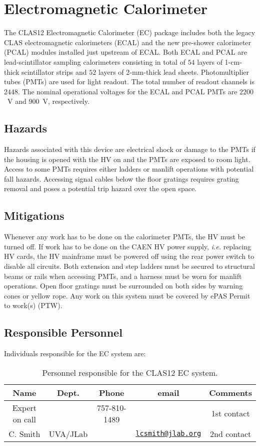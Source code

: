 \section{Electromagnetic Calorimeter}

The CLAS12 Electromagnetic Calorimeter (EC) package includes both the legacy CLAS 
electromagnetic calorimeters (ECAL) and the new pre-shower calorimeter (PCAL) modules 
installed just upstream of ECAL. Both ECAL and PCAL are lead-scintillator sampling 
calorimeters consisting in total of $54$ layers of 1-cm-thick scintillator strips and 
$52$ layers of 2-mm-thick lead sheets. Photomultiplier tubes (PMTs) are used for light 
readout. The total number of readout channels is $2448$. The nominal operational voltages 
for the ECAL and PCAL PMTs are $2200$~V and $900$~V, respectively. 

\subsection{Hazards} 

Hazards associated with this device are electrical shock or damage to the PMTs if the 
housing is opened with the HV on and the PMTs are exposed to room light.  Access to some 
PMTs requires either ladders or manlift operations with potential fall hazards. Accessing 
signal cables below the floor gratings requires grating removal and poses a potential trip 
hazard over the open space. 

\subsection{Mitigations}

Whenever any work has to be done on the calorimeter PMTs, the HV must be turned off. If work 
has to be done on the CAEN HV power supply, {\it i.e.} replacing HV cards, the HV mainframe must 
be powered off using the rear power switch to disable all circuits. Both extension and step 
ladders must be secured to structural beams or rails when accessing PMTs, and a harness must 
be worn for manlift operations. Open floor gratings must be surrounded on both sides by 
warning cones or yellow rope.  Any work on this system must be covered by ePAS Permit to work(s) (PTW).

\subsection{Responsible Personnel}

Individuals responsible for the EC system are:

\begin{table}[!htb]
\centering
\begin{tabular}{|c|c|c|c|c|} \hline
Name&Dept.&Phone&email&Comments \\ \hline
Expert on call& &757-810-1489&& 1st contact \\ \hline
C. Smith &UVA/JLab&&\href{mailto:lcsmith@jlab.org}{\nolinkurl{lcsmith@jlab.org}}&2nd contact \\ \hline
\end{tabular}
\caption{Personnel responsible for the CLAS12 EC system.} 
\label{tb:ec}
\end{table}

